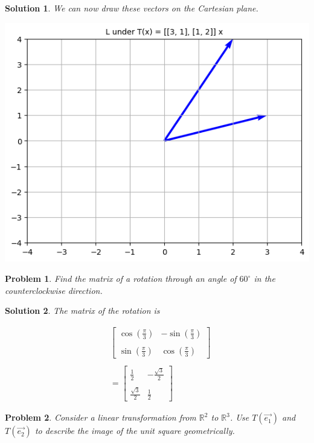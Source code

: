 \documentclass{article}
\newtheorem{problem}{Problem}
\newtheorem*{solution}{Solution}
\begin{document}
\begin{solution}
We can now draw these vectors on the Cartesian plane.

\includegraphics[scale=0.5, center]{L3112} 

\end{solution}

\begin{problem}
Find the matrix of a rotation through an angle of $60^\circ$ in the counterclockwise direction.
\end{problem}

\begin{solution}
The matrix of the rotation is

\begin{align*}
& \begin{bmatrix}
\cos(\frac{\pi}{3}) & -\sin(\frac{\pi}{3}) \\ \\
\sin(\frac{\pi}{3}) & \cos(\frac{\pi}{3})
\end{bmatrix} \\ \\
&= \begin{bmatrix}
\frac{1}{2} & -\frac{\sqrt{3}}{2} \\ \\
\frac{\sqrt{3}}{2}  & \frac{1}{2}
\end{bmatrix}
\end{align*}

\end{solution}

\begin{problem}
Consider a linear transformation from $\mathbb{R}^2$ to $\mathbb{R}^3$. Use $T(\vec{e_{1}})$ and $T(\vec{e_{2}})$ to describe the image of the unit square geometrically.
\end{problem}
\end{document}
